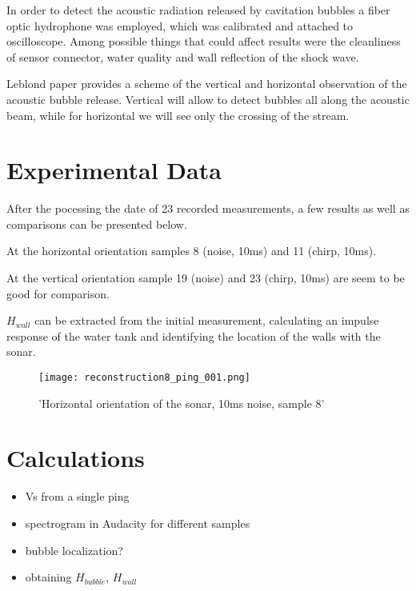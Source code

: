 In order to detect the acoustic radiation released by cavitation bubbles a fiber optic hydrophone was employed, which was calibrated and attached to oscilloscope.  
Among possible things that could affect results were the cleanliness of sensor connector, water quality and wall reflection of the shock wave.

Leblond paper provides a scheme of the vertical and horizontal observation of the acoustic bubble release\cite{leblond_acoustic_2014}. Vertical will allow to detect bubbles all along the acoustic beam, while for horizontal we will see only the crossing of the stream.

\section{Experimental Data}


After the pocessing the date of 23 recorded measurements, a few results as well as comparisons can be presented below. 

At the horizontal orientation samples 8 (noise, 10ms) and 11 (chirp, 10ms).

At the vertical orientation sample 19 (noise) and 23 (chirp, 10ms) are seem to be good for comparison.

\textbf{$H_{wall}$} can be extracted from the initial measurement, calculating an impulse response of the water tank and identifying the location of the walls with the sonar.

\begin{figure}[H]
    \texttt{[image: reconstruction8\_ping\_001.png]}
    \centering
    \caption*{'Horizontal orientation of the sonar, 10ms noise, sample 8'}
    \label{fig:H_noise_10ms_plot}
\end{figure}


\section{Calculations}

\begin{itemize}
    \item Vs from a single ping
    \item spectrogram in Audacity for different samples
    \item bubble localization?
    \item obtaining $H_{bubble}$, $H_{wall}$
\end{itemize}

